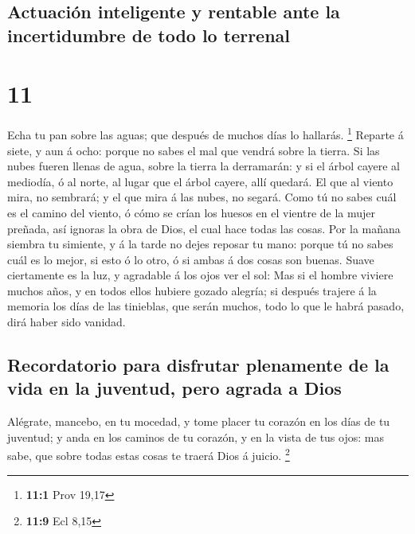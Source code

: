 \hypertarget{actuaciuxf3n-inteligente-y-rentable-ante-la-incertidumbre-de-todo-lo-terrenal}{%
\subsection{Actuación inteligente y rentable ante la incertidumbre de
todo lo
terrenal}\label{actuaciuxf3n-inteligente-y-rentable-ante-la-incertidumbre-de-todo-lo-terrenal}}

\hypertarget{section-10}{%
\section{11}\label{section-10}}

 Echa tu pan sobre las aguas; que después de muchos días lo
hallarás. \footnote{\textbf{11:1} Prov 19,17}  Reparte á
siete, y aun á ocho: porque no sabes el mal que vendrá sobre la tierra.
 Si las nubes fueren llenas de agua, sobre la tierra la
derramarán: y si el árbol cayere al mediodía, ó al norte, al lugar que
el árbol cayere, allí quedará.  El que al viento mira, no
sembrará; y el que mira á las nubes, no segará.  Como tú no
sabes cuál es el camino del viento, ó cómo se crían los huesos en el
vientre de la mujer preñada, así ignoras la obra de Dios, el cual hace
todas las cosas.  Por la mañana siembra tu simiente, y á la
tarde no dejes reposar tu mano: porque tú no sabes cuál es lo mejor, si
esto ó lo otro, ó si ambas á dos cosas son buenas.  Suave
ciertamente es la luz, y agradable á los ojos ver el sol: 
Mas si el hombre viviere muchos años, y en todos ellos hubiere gozado
alegría; si después trajere á la memoria los días de las tinieblas, que
serán muchos, todo lo que le habrá pasado, dirá haber sido vanidad.

\hypertarget{recordatorio-para-disfrutar-plenamente-de-la-vida-en-la-juventud-pero-agrada-a-dios}{%
\subsection{Recordatorio para disfrutar plenamente de la vida en la
juventud, pero agrada a
Dios}\label{recordatorio-para-disfrutar-plenamente-de-la-vida-en-la-juventud-pero-agrada-a-dios}}

 Alégrate, mancebo, en tu mocedad, y tome placer tu corazón
en los días de tu juventud; y anda en los caminos de tu corazón, y en la
vista de tus ojos: mas sabe, que sobre todas estas cosas te traerá Dios
á juicio. \footnote{\textbf{11:9} Ecl 8,15}

